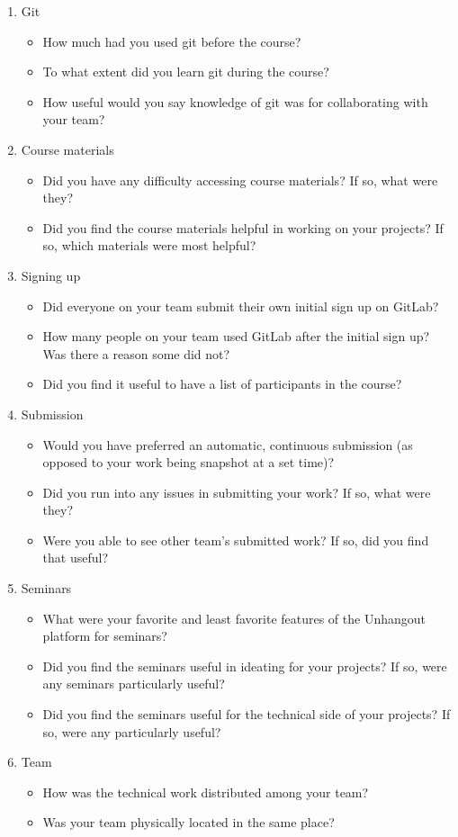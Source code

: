\documentclass[12pt,twoside,vi]{mitthesis}
\begin{document}
\begin{enumerate}
\item Git
\begin{itemize}
\item How much had you used git before the course?
\item To what extent did you learn git during the course?
\item How useful would you say knowledge of git was for collaborating with your team?
\end{itemize}
\item Course materials
\begin{itemize}
\item Did you have any difficulty accessing course materials? If so, what were they?
\item Did you find the course materials helpful in working on your projects? If so, which materials were most helpful?
\end{itemize}
\item Signing up
\begin{itemize}
\item Did everyone on your team submit their own initial sign up on GitLab?
\item How many people on your team used GitLab after the initial sign up? Was there a reason some did not?
\item Did you find it useful to have a list of participants in the course?
\end{itemize}
\item Submission
\begin{itemize}
\item Would you have preferred an automatic, continuous submission (as opposed to your work being snapshot at a set time)?
\item Did you run into any issues in submitting your work? If so, what were they?
\item Were you able to see other team's submitted work? If so, did you find that useful?
\end{itemize}
\item Seminars
\begin{itemize}
\item What were your favorite and least favorite features of the Unhangout platform for seminars?
\item Did you find the seminars useful in ideating for your projects? If so, were any seminars particularly useful?
\item Did you find the seminars useful for the technical side of your projects? If so, were any particularly useful?
\end{itemize}
\item Team
\begin{itemize}
\item How was the technical work distributed among your team?
\item Was your team physically located in the same place?
\end{itemize}
\end{enumerate}

\clearpage
\newpage
\begin{singlespace}
\nocite{*}
 

\end{singlespace}
\end{document}
